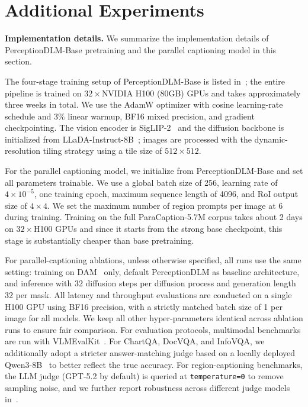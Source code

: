 \documentclass{llmxive}
\begin{document}
\section{Additional Experiments}
\label{sec:more_exp}

\noindent
\textbf{Implementation details.} We summarize the implementation details of PerceptionDLM-Base pretraining and the parallel captioning model in this section. 

The four-stage training setup of PerceptionDLM-Base is listed in~; the entire pipeline is trained on $32\times$NVIDIA H100 (80GB) GPUs and takes approximately three weeks in total. We use the AdamW optimizer with cosine learning-rate schedule and $3\%$ linear warmup, BF16 mixed precision, and gradient checkpointing. The vision encoder is SigLIP-2~\citep{tschannen2025siglip} and the diffusion backbone is initialized from LLaDA-Instruct-8B~\citep{nielarge}; images are processed with the dynamic-resolution tiling strategy using a tile size of $512\times512$.

For the parallel captioning model, we initialize from PerceptionDLM-Base and set all parameters trainable. We use a global batch size of 256, learning rate of $4\times10^{-5}$, one training epoch, maximum sequence length of 4096, and RoI output size of $4\times4$. We set the maximum number of region prompts per image at 6 during training. Training on the full ParaCaption-5.7M corpus takes about 2 days on $32\times$H100 GPUs and since it starts from the strong base checkpoint, this stage is substantially cheaper than base pretraining.

For parallel-captioning ablations, unless otherwise specified, all runs use the same setting: training on DAM~\citep{lian2025describe} only, default PerceptionDLM as baseline architecture, and inference with 32 diffusion steps per diffusion process and generation length 32 per mask.
%
All latency and throughput evaluations are conducted on a single H100 GPU using BF16 precision, with a strictly matched batch size of 1 per image for all models. We keep all other hyper-parameters identical across ablation runs to ensure fair comparison.
%
For evaluation protocols, multimodal benchmarks are run with VLMEvalKit~\citep{duan2024vlmevalkit}. For ChartQA, DocVQA, and InfoVQA, we additionally adopt a stricter answer-matching judge based on a locally deployed Qwen3-8B~\citep{yang2025qwen3} to better reflect the true accuracy. For region-captioning benchmarks, the LLM judge (GPT-5.2 by default) is queried at \texttt{temperature=0} to remove sampling noise, and we further report robustness across different judge models in~.
\end{document}
